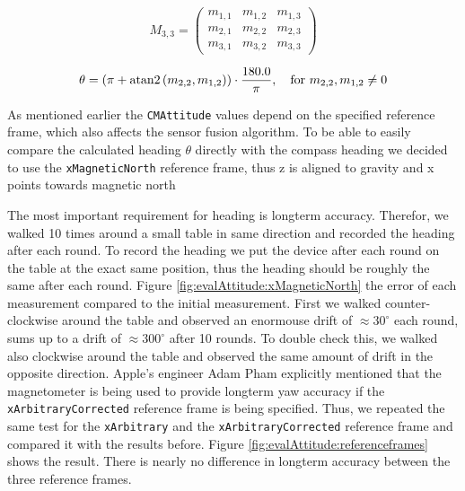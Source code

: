 \begin{equation} \label{eq:rotationmatrix}
  M_{3,3} = \begin{pmatrix}
      m_{1,1} & m_{1,2} & m_{1,3} \\
      m_{2,1} & m_{2,2} & m_{2,3} \\
      m_{3,1} & m_{3,2} & m_{3,3}
  \end{pmatrix}
\end{equation}

\begin{equation} \label{eq:rotation2heading}
  \theta = (\pi + {\rm atan2}\left(m_{2,2} , m_{1,2}\right)) \cdot \frac{180.0}{\pi}, \quad \text{for } m_{2,2}, m_{1,2} \neq 0
\end{equation}

As mentioned earlier the \texttt{CMAttitude} values depend on the specified reference frame, which also affects the sensor fusion algorithm.
To be able to easily compare the calculated heading $\theta$ directly with the compass heading we decided to use the \texttt{xMagneticNorth} reference frame, thus z is aligned to gravity and x points towards magnetic north

The most important requirement for heading is longterm accuracy. Therefor, we walked 10 times around a small table in same direction and recorded the heading after each round.
To record the heading we put the device after each round on the table at the exact same position, thus the heading should be roughly the same after each round.
Figure \ref{fig:evalAttitude:xMagneticNorth} the error of each measurement compared to the initial measurement.
First we walked counter-clockwise around the table and observed an enormouse drift of $\approx 30^{\circ}$ each round, sums up to a drift of $\approx 300^{\circ}$ after 10 rounds.
To double check this, we walked also clockwise around the table and observed the same amount of drift in the opposite direction.
Apple's engineer Adam Pham explicitly mentioned that the magnetometer is being used to provide longterm yaw accuracy if the \texttt{xArbitraryCorrected} reference frame is being specified.
Thus, we repeated the same test for the \texttt{xArbitrary} and the \texttt{xArbitraryCorrected} reference frame and compared it with the results before.
Figure \ref{fig:evalAttitude:referenceframes} shows the result. There is nearly no difference in longterm accuracy between the three reference frames.


